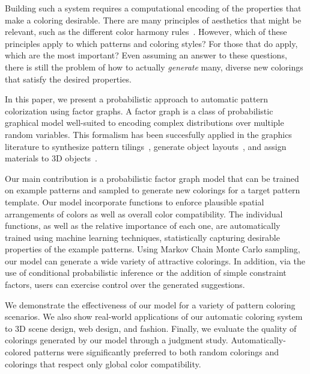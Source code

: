 Building such a system requires a computational encoding of the properties that make a coloring desirable. There are many principles of aesthetics that might be relevant, such as the different color harmony rules~\cite{ColorHarmonyBook}. However, which of these principles apply to which patterns and coloring styles? For those that do apply, which are the most important? Even assuming an answer to these questions, there is still the problem of how to actually \emph{generate} many, diverse new colorings that satisfy the desired properties.

In this paper, we present a probabilistic approach to automatic pattern colorization using factor graphs. A factor graph is a class of probabilistic graphical model well-suited to encoding complex distributions over multiple random variables. This formalism has been succesfully applied in the graphics literature to synthesize pattern tilings~\cite{YiTingTiledPatterns}, generate object layouts~\cite{YiTingLARJ}, and assign materials to 3D objects~\cite{MaterialMemex}.

Our main contribution is a probabilistic factor graph model that can be trained on example patterns and sampled to generate new colorings for a target pattern template. Our model incorporate functions to enforce plausible spatial arrangements of colors as well as overall color compatibility. The individual functions, as well as the relative importance of each one, are automatically trained using machine learning techniques, statistically capturing desirable properties of the example patterns. Using Markov Chain Monte Carlo sampling, our model can generate a wide variety of attractive colorings. In addition, via the use of conditional probabilistic inference or the addition of simple constraint factors, users can exercise control over the generated suggestions.

We demonstrate the effectiveness of our model for a variety of pattern coloring scenarios. We also show real-world applications of our automatic coloring system to 3D scene design, web design, and fashion. Finally, we evaluate the quality of colorings generated by our model through a judgment study. Automatically-colored patterns were significantly preferred to both random colorings and colorings that respect only global color compatibility.